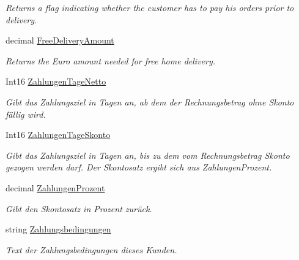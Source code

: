 \begin{DoxyCompactItemize}
\begin{DoxyCompactList}\small\item\em Returns a flag indicating whether the customer has to pay his orders prior to delivery. \end{DoxyCompactList}\item 
decimal \hyperlink{class_products_1_1_model_1_1_entities_1_1_kunde_a36c7a9e33fb7cd4f9393e9649f79fb91}{Free\+Delivery\+Amount}
\begin{DoxyCompactList}\small\item\em Returns the Euro amount needed for free home delivery. \end{DoxyCompactList}\item 
Int16 \hyperlink{class_products_1_1_model_1_1_entities_1_1_kunde_aeec796090567ee9294736d53c9f19f34}{Zahlungen\+Tage\+Netto}
\begin{DoxyCompactList}\small\item\em Gibt das Zahlungsziel in Tagen an, ab dem der Rechnungsbetrag ohne Skonto fällig wird. \end{DoxyCompactList}\item 
Int16 \hyperlink{class_products_1_1_model_1_1_entities_1_1_kunde_aba196825749ee4e75b675f2f0ad4abd6}{Zahlungen\+Tage\+Skonto}
\begin{DoxyCompactList}\small\item\em Gibt das Zahlungsziel in Tagen an, bis zu dem vom Rechnungsbetrag Skonto gezogen werden darf. Der Skontosatz ergibt sich aus Zahlungen\+Prozent. \end{DoxyCompactList}\item 
decimal \hyperlink{class_products_1_1_model_1_1_entities_1_1_kunde_a9685ac8f7149a67f90a8fafb9025639b}{Zahlungen\+Prozent}
\begin{DoxyCompactList}\small\item\em Gibt den Skontosatz in Prozent zurück. \end{DoxyCompactList}\item 
string \hyperlink{class_products_1_1_model_1_1_entities_1_1_kunde_ae4ed6da8d25622d1e1a6fecb1c8095e2}{Zahlungsbedingungen}
\begin{DoxyCompactList}\small\item\em Text der Zahlungsbedingungen dieses Kunden. \end{DoxyCompactList}\item 

\end{DoxyCompactItemize}

